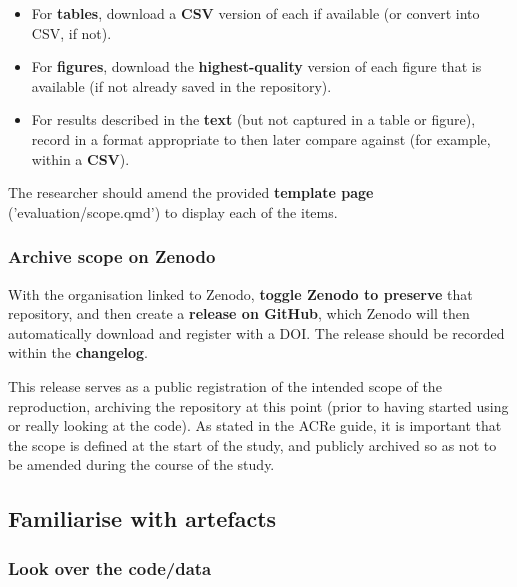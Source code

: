 \begin{itemize}
    \item For \textbf{tables}, download a \textbf{CSV} version of each if available (or convert into CSV, if not).
    \item For \textbf{figures}, download the \textbf{highest-quality} version of each figure that is available (if not already saved in the repository).
    \item For results described in the \textbf{text} (but not captured in a table or figure), record in a format appropriate to then later compare against (for example, within a \textbf{CSV}).
\end{itemize}

The researcher should amend the provided \textbf{template page} ('evaluation/scope.qmd')\autocite{heather_template_2024} to display each of the items.

\vspace{0.5cm}
\subsubsection{Archive scope on Zenodo}

With the organisation linked to Zenodo, \textbf{toggle Zenodo to preserve} that repository, and then create a \textbf{release on GitHub}, which Zenodo will then automatically download and register with a DOI. The release should be recorded within the \textbf{changelog}.

This release serves as a public registration of the intended scope of the reproduction, archiving the repository at this point (prior to having started using or really looking at the code). As stated in the ACRe guide,\autocite{berkeley_initiative_for_transparency_in_the_social_sciences_guide_2022} it is important that the scope is defined at the start of the study, and publicly archived so as not to be amended during the course of the study.\autocite{berkeley_initiative_for_transparency_in_the_social_sciences_guide_2022}

\vspace{0.5cm}
\subsection{Familiarise with artefacts}

\subsubsection{Look over the code/data}

